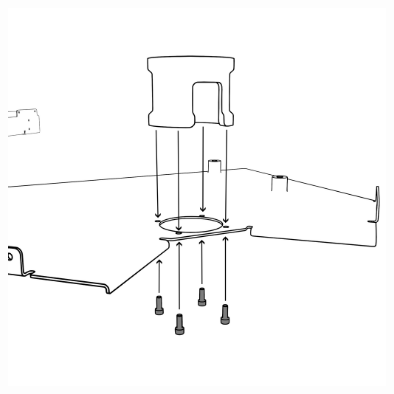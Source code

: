 \vspace{1em}

\begin{center}
    \includegraphics[height=10cm]{../images/_301_.png}
\end{center}

\vspace{0.7em}



